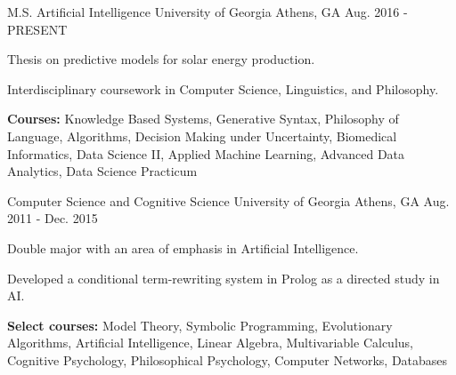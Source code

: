 \begin{cventries}

\cventry
{M.S. Artificial Intelligence}
{University of Georgia}
{Athens, GA}
{Aug. 2016 - PRESENT}
{\begin{cvitems}
    \item {Thesis on predictive models for solar energy production.}
    \item {Interdisciplinary coursework in Computer Science, Linguistics, and Philosophy.}
    \item {\textbf{Courses:} Knowledge Based Systems, Generative Syntax, Philosophy of Language, Algorithms, Decision Making under Uncertainty, Biomedical Informatics, Data Science II, Applied Machine Learning, Advanced Data Analytics, Data Science Practicum}
\end{cvitems}}

\cventry
{Computer Science and Cognitive Science}
{University of Georgia}
{Athens, GA}
{Aug. 2011 - Dec. 2015}
{\begin{cvitems}
    \item {Double major with an area of emphasis in Artificial Intelligence.}
    \item {Developed a conditional term-rewriting system in Prolog as a directed study in AI.}
    \item {\textbf{Select courses:} Model Theory, Symbolic Programming, Evolutionary Algorithms, Artificial Intelligence, Linear Algebra, Multivariable Calculus, Cognitive Psychology, Philosophical Psychology, Computer Networks, Databases}
\end{cvitems}}

\end{cventries}
